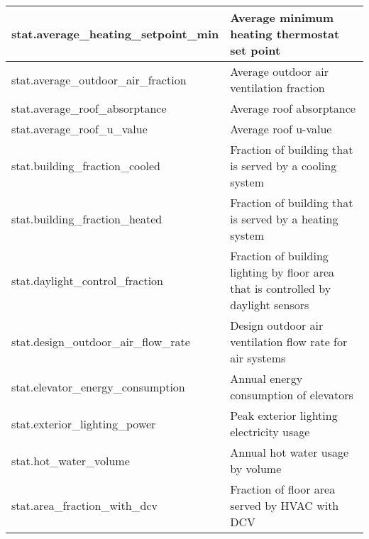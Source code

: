 \begin{center}
\begin{longtable}{|p{3in}|p{3in}|}
stat.average\_heating\_setpoint\_min                       & Average minimum heating thermostat set point                                                                           \\ \hline
stat.average\_outdoor\_air\_fraction                       & Average outdoor air ventilation fraction                                                                              \\ \hline
stat.average\_roof\_absorptance                            & Average roof absorptance                                                                                              \\ \hline
stat.average\_roof\_u\_value                               & Average roof u-value                                                                                                  \\ \hline
stat.building\_fraction\_cooled                            & Fraction of building that is served by a cooling system                                                               \\ \hline
stat.building\_fraction\_heated                            & Fraction of building that is served by a heating system                                                               \\ \hline
stat.daylight\_control\_fraction                           & Fraction of building lighting by floor area that is controlled by daylight sensors                                    \\ \hline
stat.design\_outdoor\_air\_flow\_rate                      & Design outdoor air ventilation flow rate for air systems                                                              \\ \hline
stat.elevator\_energy\_consumption                         & Annual energy consumption of elevators                                                                                \\ \hline
stat.exterior\_lighting\_power                             & Peak exterior lighting electricity usage                                                                               \\ \hline
stat.hot\_water\_volume                                    & Annual hot water usage by volume                                                                                      \\ \hline
stat.area\_fraction\_with\_dcv                             & Fraction of floor area served by HVAC with DCV                                                                        \\ \hline

\end{longtable}
\end{center}
